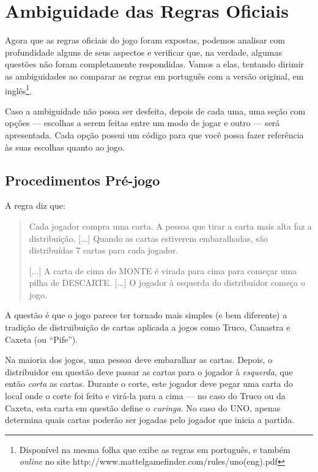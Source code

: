 \section{Ambiguidade das Regras Oficiais}

Agora que as regras oficiais do jogo foram expostas, podemos analisar com profundidade alguns de seus aspectos e verificar que, na verdade, algumas questões não foram completamente respondidas. Vamos a elas, tentando dirimir as ambiguidades ao comparar as regras em português com a versão original, em inglês\footnote{Disponível na mesma folha que exibe as regras em português, e também \textit{online} no site http://www.mattelgamefinder.com/rules/uno(eng).pdf}.

Caso a ambiguidade não possa ser desfeita, depois de cada uma, uma seção com opções --- escolhas a serem feitas entre um modo de jogar e outro --- será apresentada. Cada opção possui um código para que você possa fazer referência às suas escolhas quanto ao jogo.

\subsection{Procedimentos Pré-jogo}

A regra diz que:

\begin{quotation}
Cada jogador compra uma carta. A pessoa que tirar a carta mais alta faz a distribuição. [...] Quando as cartas estiverem embaralhadas, são distribuídas 7 cartas para cada jogador.

[...] A carta de cima do MONTE é virada para cima para começar uma pilha de DESCARTE. [...] O jogador à esquerda do distribuidor começa o jogo.
\end{quotation}

A questão é que o jogo parece ter tornado mais simples (e bem diferente) a tradição de distruibuição de cartas aplicada a jogos como Truco, Canastra e Caxeta (ou ``Pife'').

Na maioria dos jogos, uma pessoa deve embaralhar as cartas. Depois, o distribuidor em questão deve passar as cartas para o jogador à \textit{esquerda}, que então \textit{corta} as cartas. Durante o corte, este jogador deve pegar uma carta do local onde o corte foi feito e virá-la para a cima --- no caso do Truco ou da Caxeta, esta carta em questão define o \textit{curinga}. No caso do UNO, apenas determina quais cartas poderão ser jogadas pelo jogador que inicia a partida.


